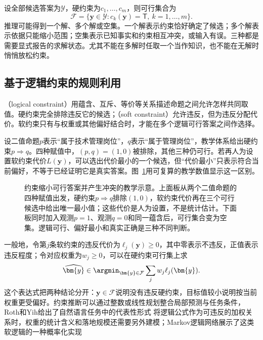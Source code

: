 设全部候选答案为$\mathcal{Y}$，硬约束为$c_1,\ldots,c_m$，则可行集合为
\begin{equation}
  \mathcal{F}
  =
  \{\bm{y}\in\mathcal{Y}:c_k(\bm{y})=\mathsf{T},\ k=1,\ldots,m\}.
  \label{eq:rule-based-knowledge-acquisition-feasible-set}
\end{equation}
推理可能得到一个解、多个解或空集。一个解表示约束恰好确定了候选；多个解表示依据只能缩小范围；空集表示已知事实和约束相互冲突，或输入有误。三种都是需要显式报告的求解状态。尤其不能在多解时任取一个当作知识，也不能在无解时悄悄放松约束。

\subsection{基于逻辑约束的规则利用}
\label{sec:rule-based-knowledge-acquisition-logical-constraint}

（logical constraint）用蕴含、互斥、等价等关系描述命题之间允许怎样共同取值。硬约束完全排除违反它的候选；（soft constraint）允许违反，但为违反分配代价。软约束只有与权重或其他偏好结合时，才能在多个逻辑可行答案之间作选择。

设二值命题$p$表示“属于技术管理岗位”，$q$表示“属于管理岗位”，教学体系给出硬约束$p\Rightarrow q$。四种赋值中，$(p,q)=(1,0)$被排除，其他三种仍可行。若再人为设置软约束代价$L(\bm{y})$，可以选出代价最小的一个候选，但“代价最小”只表示符合当前偏好，不等于已经证明它是真实答案。图~\ref{fig:rule-based-knowledge-acquisition-feasible-set}用可复算的教学数值显示这一区别。

\begin{figure}[htbp]
  \centering
  
  \caption{约束缩小可行答案并产生冲突的教学示意。上面板从两个二值命题的四种赋值出发，硬约束$p\Rightarrow q$排除$(1,0)$，软约束代价再在三个可行候选中给出唯一最小值；这些代价是人为设置，不是统计估计。下面板同时加入观测$p=1$、观测$q=0$和同一蕴含后，可行集合变为空集。逻辑可行、偏好最小和真实正确是三种不同判断。}
  \label{fig:rule-based-knowledge-acquisition-feasible-set}
\end{figure}

一般地，令第$j$条软约束的违反代价为$\ell_j(\bm{y})\geq0$，其中零表示不违反，正值表示违反程度；令对应权重为$w_j\geq0$，可以在硬约束可行集上求
\begin{equation}
  \widehat{\bm{y}}
  \in
  \argmin_{\bm{y}\in\mathcal{F}}
  \sum_j w_j\ell_j(\bm{y}).
  \label{eq:rule-based-knowledge-acquisition-soft-constraint}
\end{equation}
这个表达式把两种结论分开：$\bm{y}\in\mathcal{F}$说明没有违反硬约束，目标值较小说明按当前权重更受偏好。约束推断可以通过整数或线性规划整合局部预测与任务条件，Roth和Yih给出了自然语言任务中的代表性形式 将逻辑公式作为可违反的加权关系时，权重的统计含义和落地规模还需要另外建模；Markov逻辑网络展示了这类软逻辑的一种概率化实现

